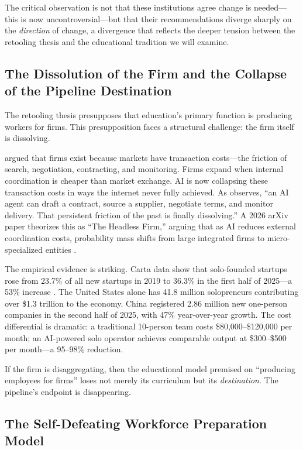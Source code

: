 \documentclass[12pt]{article}
\begin{document}
The critical observation is not that these institutions agree change is needed---this is now uncontroversial---but that their recommendations diverge sharply on the \emph{direction} of change, a divergence that reflects the deeper tension between the retooling thesis and the educational tradition we will examine.

\subsection{The Dissolution of the Firm and the Collapse of the Pipeline Destination}
\label{sec:dissolution}

The retooling thesis presupposes that education's primary function is producing workers for firms. This presupposition faces a structural challenge: the firm itself is dissolving.

\citet{Coase1937firm} argued that firms exist because markets have transaction costs---the friction of search, negotiation, contracting, and monitoring. Firms expand when internal coordination is cheaper than market exchange. AI is now collapsing these transaction costs in ways the internet never fully achieved. As \citet{Yu2025coase} observes, ``an AI agent can draft a contract, source a supplier, negotiate terms, and monitor delivery. That persistent friction of the past is finally dissolving.'' A 2026 arXiv paper theorizes this as ``The Headless Firm,'' arguing that as AI reduces external coordination costs, probability mass shifts from large integrated firms to micro-specialized entities \citep{HeadlessFirm2026}.

The empirical evidence is striking. Carta data show that solo-founded startups rose from 23.7\% of all new startups in 2019 to 36.3\% in the first half of 2025---a 53\% increase \citep{Carta2025solo}. The United States alone has 41.8 million solopreneurs contributing over \$1.3 trillion to the economy. China registered 2.86 million new one-person companies in the second half of 2025, with 47\% year-over-year growth. The cost differential is dramatic: a traditional 10-person team costs \$80,000--\$120,000 per month; an AI-powered solo operator achieves comparable output at \$300--\$500 per month---a 95--98\% reduction.

If the firm is disaggregating, then the educational model premised on ``producing employees for firms'' loses not merely its curriculum but its \emph{destination}. The pipeline's endpoint is disappearing.

\subsection{The Self-Defeating Workforce Preparation Model}
\label{sec:self-defeating}
\end{document}
